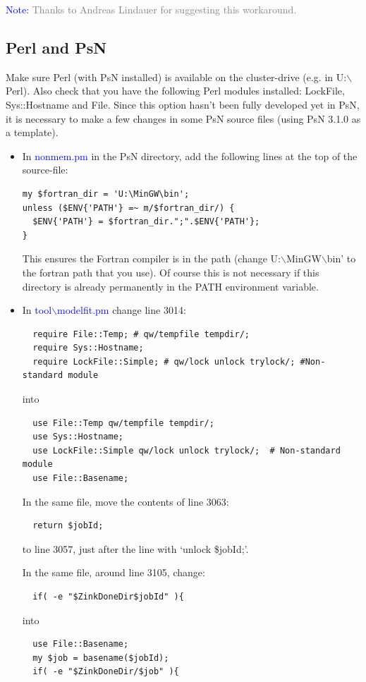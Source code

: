 \documentclass[a4,11pt]{report} \usepackage[pdftex]{graphicx}
\begin{document}
\vspace{8pt}
\noindent\scriptsize{\textcolor{Blue}{Note:} \textcolor{Grey}{Thanks
to Andreas Lindauer for suggesting this workaround.  } \normalsize


\subsection*{Perl and PsN} Make sure Perl (with
PsN installed) is available on the cluster-drive (e.g. in
U:$\backslash$Perl). Also check that you have the following Perl
modules installed: LockFile, Sys::Hostname and File.  Since this
option hasn't been fully developed yet in PsN, it is necessary to make
a few changes in some PsN source files (using PsN 3.1.0 as a
template).
\begin{itemize}
\item In \textcolor{Blue}{nonmem.pm} in the PsN directory, add the
following lines at the top of the source-file:
\begin{verbatim}
my $fortran_dir = 'U:\MinGW\bin';
unless ($ENV{'PATH'} =~ m/$fortran_dir/) {
  $ENV{'PATH'} = $fortran_dir.";".$ENV{'PATH'};
}
\end{verbatim} This ensures the Fortran compiler is in the path
(change U:$\backslash$MinGW$\backslash$bin' to the fortran path that
you use). Of course this is not necessary if this directory is
already permanently in the PATH environment variable.

\item In \textcolor{Blue}{tool$\backslash$modelfit.pm} change line
3014:
\begin{verbatim}
  require File::Temp; # qw/tempfile tempdir/;
  require Sys::Hostname;
  require LockFile::Simple; # qw/lock unlock trylock/; #Non-standard module
\end{verbatim}
into
\begin{verbatim}
  use File::Temp qw/tempfile tempdir/;
  use Sys::Hostname;
  use LockFile::Simple qw/lock unlock trylock/;  # Non-standard module
  use File::Basename;
\end{verbatim}

In the same file, move the contents of line 3063:
\begin{verbatim}
  return $jobId;
\end{verbatim}
to line 3057, just after the line with `unlock \$jobId;'.

In the same file, around line 3105, change:
\begin{verbatim}
  if( -e "$ZinkDoneDir$jobId" ){
\end{verbatim}
into
\begin{verbatim}
  use File::Basename;
  my $job = basename($jobId);
  if( -e "$ZinkDoneDir/$job" ){
\end{verbatim}


\end{itemize}}
\end{document}

